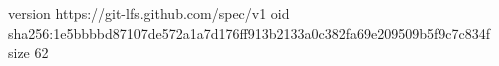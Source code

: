 version https://git-lfs.github.com/spec/v1
oid sha256:1e5bbbbd87107de572a1a7d176ff913b2133a0c382fa69e209509b5f9c7c834f
size 62
